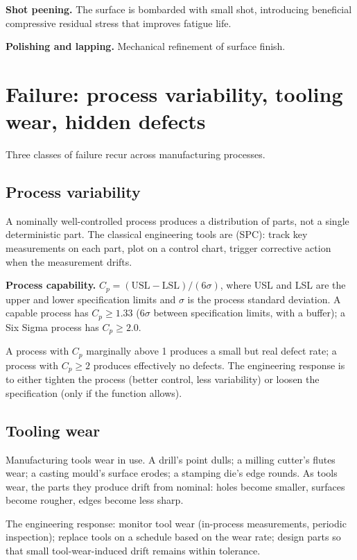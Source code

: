 \textbf{Shot peening.} The surface is bombarded with small shot, introducing beneficial compressive residual stress that improves fatigue life.

\textbf{Polishing and lapping.} Mechanical refinement of surface finish.

\section{Failure: process variability, tooling wear, hidden defects}

Three classes of failure recur across manufacturing processes.

\subsection{Process variability}

A nominally well-controlled process produces a distribution of parts, not a single deterministic part. The classical engineering tools are  (SPC): track key measurements on each part, plot on a control chart, trigger corrective action when the measurement drifts.

\textbf{Process capability.} $C_p = (\text{USL} - \text{LSL})/(6\sigma)$, where USL and LSL are the upper and lower specification limits and $\sigma$ is the process standard deviation. A capable process has $C_p \geq 1.33$ (6$\sigma$ between specification limits, with a buffer); a Six Sigma process has $C_p \geq 2.0$.

A process with $C_p$ marginally above 1 produces a small but real defect rate; a process with $C_p \geq 2$ produces effectively no defects. The engineering response is to either tighten the process (better control, less variability) or loosen the specification (only if the function allows).

\subsection{Tooling wear}

Manufacturing tools wear in use. A drill's point dulls; a milling cutter's flutes wear; a casting mould's surface erodes; a stamping die's edge rounds. As tools wear, the parts they produce drift from nominal: holes become smaller, surfaces become rougher, edges become less sharp.

The engineering response: monitor tool wear (in-process measurements, periodic inspection); replace tools on a schedule based on the wear rate; design parts so that small tool-wear-induced drift remains within tolerance.

